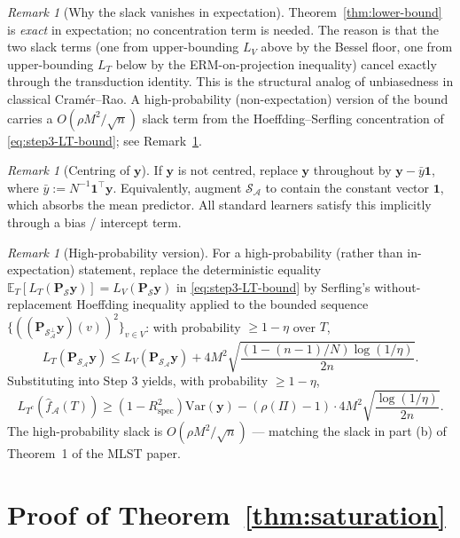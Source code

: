 \documentclass[11pt,a4paper]{article}
\theoremstyle{plain}
\theoremstyle{definition}
\theoremstyle{remark}
\newtheorem{remark}[theorem]{Remark}
\newcommand{\by}{\mathbf{y}}
\newcommand{\bP}{\mathbf{P}}
\newcommand{\bone}{\mathbf{1}}
\newcommand{\E}{\mathbb{E}}
\newcommand{\Var}{\mathrm{Var}}
\newcommand{\Rspec}{R^2_{\mathrm{spec}}}
\newcommand{\Scal}{\mathcal{S}}
\newcommand{\Acal}{\mathcal{A}}
\begin{document}
\begin{remark}[Why the slack vanishes in expectation]
\label{rem:no-slack}
Theorem~\ref{thm:lower-bound} is \emph{exact} in expectation; no
concentration term is needed.  The reason is that the two slack terms
(one from upper-bounding $L_V$ above by the Bessel floor, one from
upper-bounding $L_T$ below by the ERM-on-projection inequality) cancel
exactly through the transduction identity.  This is the structural
analog of unbiasedness in classical Cram\'er--Rao.  A high-probability
(non-expectation) version of the bound carries a $O(\rho M^2/\sqrt{n})$
slack term from the Hoeffding--Serfling concentration of \eqref{eq:step3-LT-bound};
see Remark~\ref{rem:high-prob}.
\end{remark}

\begin{remark}[Centring of $\by$]
\label{rem:centering}
If $\by$ is not centred, replace $\by$ throughout by $\by - \bar y \bone$,
where $\bar y := N^{-1}\bone^\top \by$.  Equivalently, augment $\Scal_\Acal$
to contain the constant vector $\bone$, which absorbs the mean predictor.
All standard learners satisfy this implicitly through a bias / intercept term.
\end{remark}

\begin{remark}[High-probability version]
\label{rem:high-prob}
For a high-probability (rather than in-expectation) statement, replace
the deterministic equality $\E_T[L_T(\bP_\Scal\by)] = L_V(\bP_\Scal\by)$
in \eqref{eq:step3-LT-bound} by Serfling's without-replacement Hoeffding
inequality applied to the bounded sequence
$\{((\bP_{\Scal_\Acal^\perp}\by)(v))^2\}_{v \in V}$: with probability
$\geq 1 - \eta$ over $T$,
$$
L_T(\bP_{\Scal_\Acal}\by)
\leq L_V(\bP_{\Scal_\Acal}\by)
    + 4 M^2 \sqrt{\frac{(1 - (n-1)/N)\log(1/\eta)}{2 n}}.
$$
Substituting into Step 3 yields, with probability $\geq 1 - \eta$,
$$
L_{T^c}(\hat f_\Acal(T))
\geq (1 - \Rspec) \Var(\by)
    - (\rho(\Pi) - 1) \cdot 4 M^2 \sqrt{\frac{\log(1/\eta)}{2 n}}.
$$
The high-probability slack is $O(\rho M^2/\sqrt{n})$ — matching the slack
in part (b) of Theorem~1 of the MLST paper.
\end{remark}

\section{Proof of Theorem~\ref{thm:saturation}}
\label{sec:proof-thm2}
\end{document}
